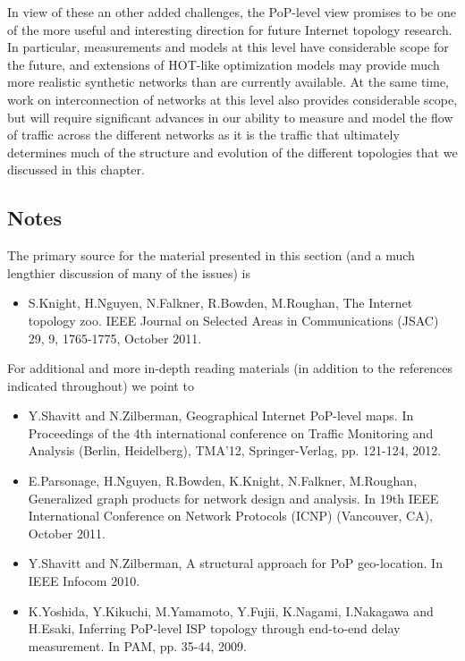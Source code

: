 In view of these an other added challenges, the PoP-level view promises
to be one of the more useful and interesting direction for future Internet
topology research.  In particular, measurements and models at this level have
considerable scope for the future, and extensions of HOT-like optimization
models may provide much more realistic synthetic networks than are
currently available. At the same time, work on interconnection of networks 
at this level also provides considerable scope, but will require significant
advances in our ability to measure and model the flow of traffic across the
different networks as it is the traffic that ultimately determines much of
the structure and evolution of the different topologies that we discussed 
in this chapter.

\subsection{Notes}

The primary source for the material presented in this section (and a
much lengthier discussion of many of the issues) is

\begin{itemize}
\item[\cite{Zoo}] S.Knight, H.Nguyen, N.Falkner, R.Bowden, M.Roughan,
  The Internet topology zoo. IEEE Journal on Selected Areas in
  Communications (JSAC) 29, 9, 1765-1775, October 2011.

\end{itemize}

\noindent For additional and more in-depth reading materials (in
addition to the references indicated throughout) we point to

\begin{itemize}

\item[\cite{Shavitt:2012:GIP:2238856.2238872}] Y.Shavitt and
  N.Zilberman, Geographical Internet PoP-level maps. In Proceedings of
  the 4th international conference on Traffic Monitoring and Analysis
  (Berlin, Heidelberg), TMA'12, Springer-Verlag, pp. 121-124, 2012.

\item[\cite{parsonage11:_gener_graph_produc_networ_desig_analy}]
  E.Parsonage, H.Nguyen, R.Bowden, K.Knight, N.Falkner, M.Roughan,
  Generalized graph products for network design and analysis. In 19th
  IEEE International Conference on Network Protocols (ICNP)
  (Vancouver, CA), October 2011.

\item[\cite{Shavitt10}] Y.Shavitt and N.Zilberman, A structural
  approach for PoP geo-location. In IEEE Infocom 2010.

\item[\cite{Yoshida09}] K.Yoshida, Y.Kikuchi, M.Yamamoto, Y.Fujii,
  K.Nagami, I.Nakagawa and H.Esaki, Inferring PoP-level ISP topology
  through end-to-end delay measurement. In PAM, pp. 35-44, 2009.

\end{itemize}

